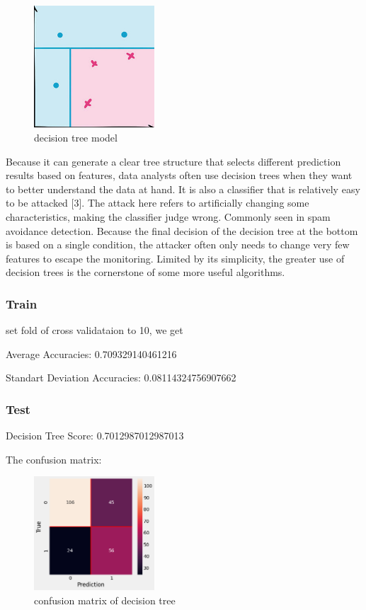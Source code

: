 \documentclass[11pt,en]{elegantpaper}
\begin{document}
\begin{figure}[H]
    \centering
    \includegraphics[width=0.4\textwidth]{figure/dt-model}
    \caption{decision tree model}
\end{figure}
Because it can generate a clear tree structure that selects different prediction results based on features, data analysts often use decision trees when they want to better understand the data at hand. It is also a classifier that is relatively easy to be attacked [3]. The attack here refers to artificially changing some characteristics, making the classifier judge wrong. Commonly seen in spam avoidance detection. Because the final decision of the decision tree at the bottom is based on a single condition, the attacker often only needs to change very few features to escape the monitoring. Limited by its simplicity, the greater use of decision trees is the cornerstone of some more useful algorithms.

\subsubsection{Train}
set fold of cross validataion to 10, we get

Average Accuracies:  0.709329140461216

Standart Deviation Accuracies:  0.08114324756907662

\subsubsection{Test}
Decision Tree Score:  0.7012987012987013

The confusion matrix:
\begin{figure}[H]
    \centering
    \includegraphics[width=0.4\textwidth]{figure/conmat-dt.png}
    \caption{confusion matrix of decision tree}
\end{figure}
\end{document}
